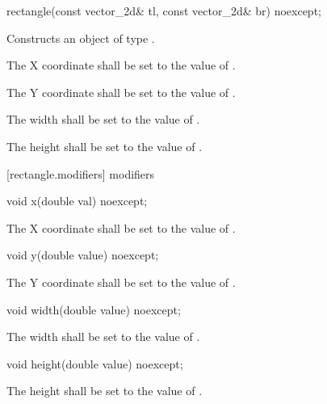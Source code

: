 \begin{itemdecl}
rectangle(const vector_2d& tl, const vector_2d& br) noexcept;
\end{itemdecl}
\begin{itemdescr}
	\pnum
	\effects
	Constructs an object of type .
	
	\pnum
	The X coordinate shall be set to the value of .
	
	\pnum
	The Y coordinate shall be set to the value of .
	
	\pnum
	The width shall be set to the value of .
	
	\pnum
	The height shall be set to the value of .
\end{itemdescr}

 [rectangle.modifiers]{ modifiers}

\begin{itemdecl}
void x(double val) noexcept;
\end{itemdecl}

\begin{itemdescr}
	\pnum
	\effects
	The X coordinate shall be set to the value of .
\end{itemdescr}

\begin{itemdecl}
void y(double value) noexcept;
\end{itemdecl}
\begin{itemdescr}
	\pnum
	\effects
	The Y coordinate shall be set to the value of .
\end{itemdescr}

\begin{itemdecl}
void width(double value) noexcept;
\end{itemdecl}
\begin{itemdescr}
	\pnum
	\effects
	The width shall be set to the value of .
\end{itemdescr}

\begin{itemdecl}
void height(double value) noexcept;
\end{itemdecl}
\begin{itemdescr}
	\pnum
	\effects
	The height shall be set to the value of .
\end{itemdescr}

